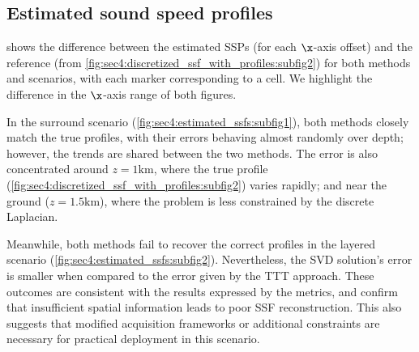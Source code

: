 

\subsection{Estimated sound speed profiles}

 shows the difference between the estimated SSPs (for each $\x$-axis offset) and the reference (from \cref{fig:sec4:discretized_ssf_with_profiles:subfig2}) for both methods and scenarios, with each marker corresponding to a cell. We highlight the difference in the $\x$-axis range of both figures.

In the surround scenario (\cref{fig:sec4:estimated_ssfs:subfig1}), both methods closely match the true profiles, with their errors behaving almost randomly over depth; however, the trends are shared between the two methods. The error is also concentrated around $z = 1\si{\kilo\meter}$, where the true profile (\cref{fig:sec4:discretized_ssf_with_profiles:subfig2}) varies rapidly; and near the ground ($z = 1.5\si{\kilo\meter}$), where the problem is less constrained by the discrete Laplacian.

Meanwhile, both methods fail to recover the correct profiles in the layered scenario (\cref{fig:sec4:estimated_ssfs:subfig2}). Nevertheless, the SVD solution's error is smaller when compared to the error given by the TTT approach. These outcomes are consistent with the results expressed by the metrics, and confirm that insufficient spatial information leads to poor SSF reconstruction. This also suggests that modified acquisition frameworks or additional constraints are necessary for practical deployment in this scenario.


